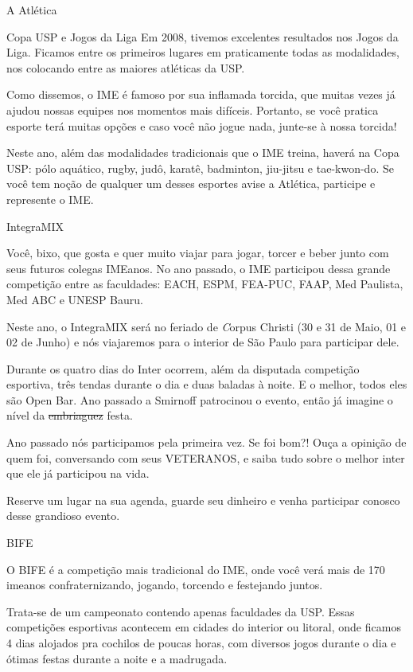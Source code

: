\begin{secao}{A Atlética}
\begin{subsecao}{Copa USP e Jogos da Liga}
Em 2008, tivemos excelentes resultados nos Jogos da Liga. Ficamos entre os
primeiros lugares em praticamente todas as modalidades, nos colocando entre as
maiores atléticas da USP.

Como dissemos, o IME é famoso por sua inflamada torcida, que muitas vezes já
ajudou nossas equipes nos momentos mais difíceis. Portanto, se você pratica
esporte terá muitas opções e caso você não jogue nada, junte-se à nossa torcida!

Neste ano, além das modalidades tradicionais que o IME treina, haverá na Copa 
USP: pólo aquático, rugby, judô, karatê, badminton, jiu-jitsu e tae-kwon-do. Se 
você tem noção de qualquer um desses esportes avise a Atlética, participe e 
represente o IME.

\end{subsecao}
\begin{subsecao}{IntegraMIX}

Você, bixo, que gosta e quer muito viajar para jogar, torcer e beber junto com 
seus futuros colegas IMEanos. No ano passado, o IME participou dessa grande 
competição entre as faculdades: EACH, ESPM, FEA-PUC, FAAP, Med Paulista, Med 
ABC e UNESP Bauru.

Neste ano, o IntegraMIX será no feriado de {\textit Corpus Christi} (30 e 31 de Maio, 01 e 02 de Junho) e nós viajaremos para o interior de São Paulo para participar dele.

Durante os quatro dias do Inter ocorrem, além da disputada competição 
esportiva, três tendas durante o dia e duas baladas à noite. E o melhor, todos 
eles são Open Bar. Ano passado a Smirnoff patrocinou o evento, então já imagine 
o nível da \sout{embriaguez} festa.

Ano passado nós participamos pela primeira vez. Se foi bom?! Ouça a opinição de 
quem foi, conversando com seus VETERANOS, e saiba tudo sobre o melhor inter que 
ele já participou na vida.

Reserve um lugar na sua agenda, guarde seu dinheiro e venha participar conosco 
desse grandioso evento.

\end{subsecao}
\begin{subsecao}{BIFE}

O BIFE é a competição mais tradicional do IME, onde você verá mais de 170 
imeanos confraternizando, jogando, torcendo e festejando juntos.

Trata-se de um campeonato contendo apenas faculdades da USP. Essas competições
esportivas acontecem em cidades do interior ou litoral, onde ficamos 4 dias
alojados pra cochilos de poucas horas, com diversos jogos durante o dia e ótimas
festas durante a noite e a madrugada.


\end{subsecao}
\end{secao}
